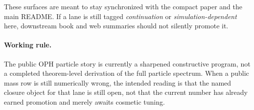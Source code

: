 \documentclass[11pt]{article}
\begin{document}
These surfaces are meant to stay synchronized with the compact paper and the
main README. If a lane is still tagged \emph{continuation} or
\emph{simulation-dependent} here, downstream book and web summaries should not
silently promote it.

\paragraph{Working rule.}
The public OPH particle story is currently a sharpened constructive program, not
a completed theorem-level derivation of the full particle spectrum. When a
public mass row is still numerically wrong, the intended reading is that the
named closure object for that lane is still open, not that the current number
has already earned promotion and merely awaits cosmetic tuning.
\end{document}
